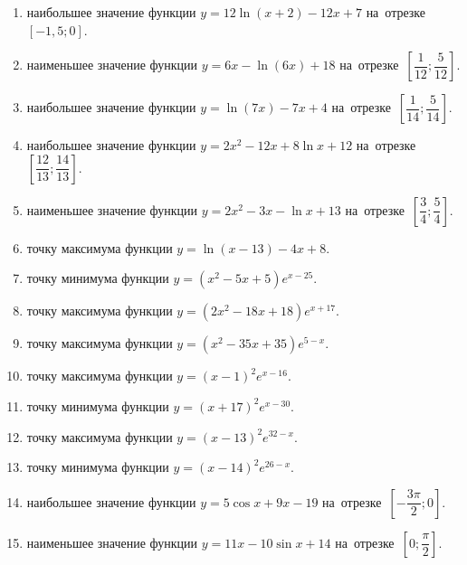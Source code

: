 \documentclass[a4paper,10pt]{article}
\begin{document}
\begin{enumerate}
\item {} наибольшее значение функции $y = 12\ln \left(x+2\right)-12x +7$ на~отрезке~$\left[-1,5;0\right]$.

\item {} наименьшее значение функции $y = 6x-\ln \left(6x\right)+18$ на~отрезке~$\left[\dfrac{1}{12};\dfrac{5}{12}\right]$.

\item {} наибольшее значение функции $y = \ln \left(7x\right)-7x+4$ на~отрезке~$\left[\dfrac{1}{14};\dfrac{5}{14}\right]$.

\item {} наибольшее значение функции $y=2x^2-12x+8\ln x+12$ на~отрезке~$\left[\dfrac{12}{13};\dfrac{14}{13}\right]$.

\item {} наименьшее значение функции $y=2x^2-3x-\ln x+13$ на~отрезке~$\left[\dfrac{3}{4};\dfrac{5}{4}\right]$.

\item {} точку максимума функции $y=\ln \left(x-13\right)-4x+8$.

\item {} точку минимума функции $y=\left(x^2-5x+5\right)e^{x-25}$.

\item {} точку максимума функции $y=\left(2x^2-18x+18\right)e^{x+17}$.

\item {} точку максимума функции $y=\left(x^2-35x+35\right)e^{5-x}$.

\item {} точку максимума функции $y=\left(x -1\right)^2e^{x-16}$.

\item {} точку минимума функции $y=\left(x +17\right)^2e^{x-30}$.

\item {} точку максимума функции $y=\left(x -13\right)^2e^{32-x}$.

\item {} точку минимума функции $y=\left(x -14\right)^2e^{26-x}$.

\item {} наибольшее значение функции $y=5\cos x+9x -19$ на~отрезке~$\left[-\dfrac{3\pi }{2};0\right]$.

\item {} наименьшее значение функции $y=11x-10\sin x +14$ на~отрезке~$\left[0;\dfrac{\pi }{2}\right]$.


\end{enumerate}
\end{document}
